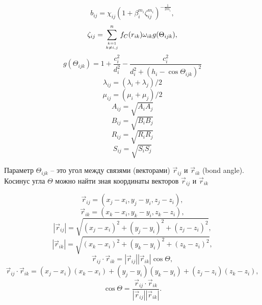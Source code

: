 \begin{equation}
b_{ij} = \chi_{ij} 	(1 + \beta_{i}^{m_i} \zeta_{ij}^{m_i}) ^ {-\frac{1}{2m_i}}, 
\end{equation}
\begin{equation}
\zeta_{ij} = \displaystyle\sum_{k=1 \atop k \neq i, j}^{n}f_C(r_{ik})\omega_{ik}g(\Theta_{ijk}), 
\end{equation}
\begin{equation}
g(\Theta_{ijk}) = 1 + \frac{c_i^2}{d_i^2} - \frac{c_i^2}{d_i^2 + (h_i - \cos\Theta_{ijk}) ^ 2}
\end{equation}
\begin{equation}
\lambda_{ij} = (\lambda_i + \lambda_j) / 2
\end{equation}
\begin{equation}
\mu_{ij} = (\mu_i + \mu_j) / 2
\end{equation}
\begin{equation}
A_{ij} = \sqrt{A_i A_j}
\end{equation}
\begin{equation}
B_{ij} = \sqrt{B_i B_j}
\end{equation}
\begin{equation}
R_{ij} = \sqrt{R_i R_j}
\end{equation}
\begin{equation}
S_{ij} = \sqrt{S_i S_j}
\end{equation}

Параметр $\Theta_{ijk}$ -- это угол между связями (векторами) $\vec{r}_{ij}$ и $\vec{r}_{ik}$ (bond angle). Косинус угла $\Theta$ можно найти зная координаты 
векторов $\vec{r}_{ij}$ и  $\vec{r}_{ik}$

\begin{equation}
\vec{r}_{ij} = (x_j - x_i, y_j - y_i, z_j - z_i), 
\end{equation}
\begin{equation}
\vec{r}_{ik} = (x_k - x_i, y_k - y_i, z_k - z_i), 
\end{equation}
\begin{equation}
|\vec{r}_{ij}| = \sqrt{(x_j - x_i)^2 + (y_j - y_i)^2 + (z_j - z_i)^2}, 
\end{equation}
\begin{equation}
|\vec{r}_{ik}| = \sqrt{(x_k - x_i)^2 + (y_k - y_i)^2 + (z_k - z_i)^2}, 
\end{equation}
\begin{equation}
\vec{r}_{ij} \cdot \vec{r}_{ik} = |\vec{r}_{ij}| |\vec{r}_{ik}| \cos\Theta , 
\end{equation}
\begin{equation}
\vec{r}_{ij} \cdot \vec{r}_{ik} = (x_j - x_i)(x_k - x_i) + (y_j - y_i)(y_k - y_i) + (z_j - z_i)(z_k - z_i),
\end{equation}
\begin{equation}
\cos\Theta = \frac{\vec{r}_{ij} \cdot \vec{r}_{ik}} {|\vec{r}_{ij}| |\vec{r}_{ik}|}.
\end{equation}


